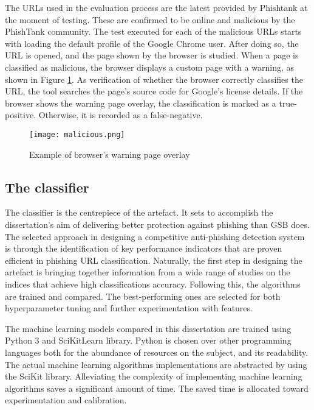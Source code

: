 The URLs used in the evaluation process are the latest provided by Phishtank at the moment of testing. These are confirmed to be online and malicious by the PhishTank community. The test executed for each of the malicious URLs starts with loading the default profile of the Google Chrome user. After doing so, the URL is opened, and the page shown by the browser is studied. When a page is classified as malicious, the browser displays a custom page with a warning, as shown in Figure \ref{fig:PHISHING_PREVENTED}. As verification of whether the browser correctly classifies the URL, the tool searches the page's source code for Google's license details. If the browser shows the warning page overlay, the classification is marked as a true-positive. Otherwise, it is recorded as a false-negative.

\begin{figure}
	\centering
	\texttt{[image: malicious.png]}
	\caption{Example of browser's warning page overlay}
	\label{fig:PHISHING_PREVENTED}
\end{figure}

\subsection{The classifier}
The classifier is the centrepiece of the artefact. It sets to accomplish the dissertation's aim of delivering better protection against phishing than GSB does. The selected approach in designing a competitive anti-phishing detection system is through the identification of key performance indicators that are proven efficient in phishing URL classification. Naturally, the first step in designing the artefact is bringing together information from a wide range of studies on the indices that achieve high classifications accuracy. Following this, the algorithms are trained and compared. The best-performing ones are selected for both hyperparameter tuning and further experimentation with features.

The machine learning models compared in this dissertation are trained using Python 3 and SciKitLearn \citep{Pedregosa} library. Python is chosen over other programming languages both for the abundance of resources on the subject, and its readability. The actual machine learning algorithms implementations are abstracted by using the SciKit library. Alleviating the complexity of implementing machine learning algorithms saves a significant amount of time. The saved time is allocated toward experimentation and calibration.

